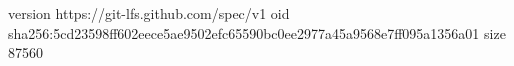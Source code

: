 version https://git-lfs.github.com/spec/v1
oid sha256:5cd23598ff602eece5ae9502efc65590bc0ee2977a45a9568e7ff095a1356a01
size 87560
